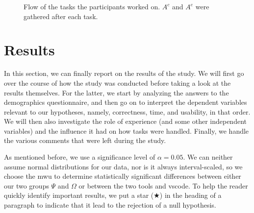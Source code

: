 \documentclass[../thesis]{subfiles}
\begin{document}
\begin{figure}
\begin{center}
	\end{center}
	\caption{Flow of the tasks the participants worked on.
		$A^c$ and $A^e$ were gathered after each task.
	}\label{fig:taskflow}
\end{figure}


\section{Results}\label{sec:results}
In this section, we can finally report on the results of the study.
We will first go over the course of how the study was conducted before taking a look at the results themselves.
For the latter, we start by analyzing the answers to the demographics questionnaire, and then go on to interpret the dependent variables relevant to our hypotheses, namely, correctness, time, and usability, in that order.
We will then also investigate the role of experience (and some other independent variables) and the influence it had on how tasks were handled.
Finally, we handle the various comments that were left during the study.

As mentioned before, we use a significance level of $\alpha = 0.05$.
We can neither assume normal distributions for our data, nor is it always interval-scaled, so we choose the \gls{mwu} to determine statistically significant differences between either our two groups $\Psi$ and $\Omega$ or between the two tools \SEE{} and \gls{vscode}.
To help the reader quickly identify important results, we put a star ($\bigstar$) in the heading of a paragraph to indicate that it lead to the rejection of a null hypothesis.


\end{document}
